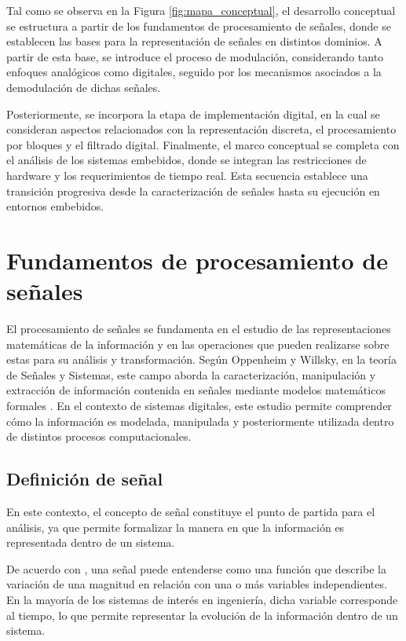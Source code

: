 Tal como se observa en la Figura \ref{fig:mapa_conceptual}, el desarrollo conceptual se estructura a partir de los fundamentos de procesamiento de señales, donde se establecen las bases para la representación de señales en distintos dominios. A partir de esta base, se introduce el proceso de modulación, considerando tanto enfoques analógicos como digitales, seguido por los mecanismos asociados a la demodulación de dichas señales.

Posteriormente, se incorpora la etapa de implementación digital, en la cual se consideran aspectos relacionados con la representación discreta, el procesamiento por bloques y el filtrado digital. Finalmente, el marco conceptual se completa con el análisis de los sistemas embebidos, donde se integran las restricciones de hardware y los requerimientos de tiempo real. Esta secuencia establece una transición progresiva desde la caracterización de señales hasta su ejecución en entornos embebidos.



\section{Fundamentos de procesamiento de señales}

El procesamiento de señales se fundamenta en el estudio de las representaciones matemáticas de la información y en las operaciones que pueden realizarse sobre estas para su análisis y transformación. Según Oppenheim y Willsky, en la teoría de Señales y Sistemas, este campo aborda la caracterización, manipulación y extracción de información contenida en señales mediante modelos matemáticos formales \cite{oppenheim1997}. En el contexto de sistemas digitales, este estudio permite comprender cómo la información es modelada, manipulada y posteriormente utilizada dentro de distintos procesos computacionales.

\subsection{Definición de señal}

En este contexto, el concepto de señal constituye el punto de partida para el análisis, ya que permite formalizar la manera en que la información es representada dentro de un sistema.

De acuerdo con \cite{oppenheim1997}, una señal puede entenderse como una función que describe la variación de una magnitud en relación con una o más variables independientes. En la mayoría de los sistemas de interés en ingeniería, dicha variable corresponde al tiempo, lo que permite representar la evolución de la información dentro de un sistema.

